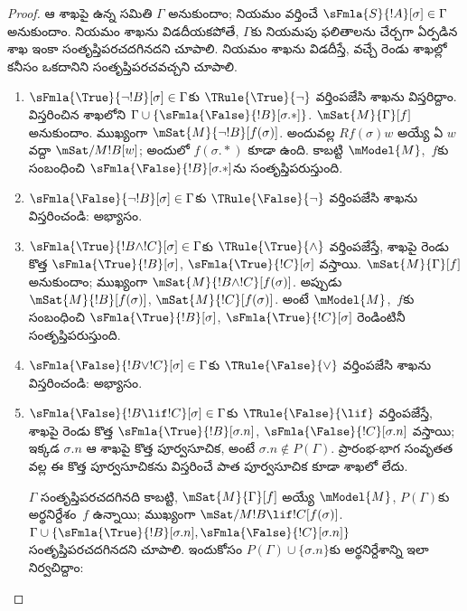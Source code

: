 \documentclass[../../../include/open-logic-section]{subfiles}
\begin{document}
\begin{proof}
ఆ శాఖపై ఉన్న  సమితి
$\Gamma$ అనుకుందాం; నియమం వర్తించే
$\sFmla{S}{!A}[\sigma] \in \Gamma$
అనుకుందాం. నియమం శాఖను
విడదీయకపోతే, $\Gamma$కు నియమపు
ఫలితాలను చేర్చగా ఏర్పడిన శాఖ
ఇంకా సంతృప్తిపరచదగినదని చూపాలి.
నియమం శాఖను విడదీస్తే, వచ్చే రెండు శాఖల్లో
కనీసం ఒకదానిని సంతృప్తిపరచవచ్చని చూపాలి.
\begin{enumerate}
\item $\sFmla{\True}{\lnot !B}[\sigma] \in \Gamma$కు
  $\TRule{\True}{\lnot}$ వర్తింపజేసి
  శాఖను విస్తరిద్దాం. విస్తరించిన
  శాఖలోని  $\Gamma \cup
  \{\sFmla{\False}{!B}[\sigma.{*}]\}$.
  $\mSat{M}{\Gamma}[f]$ అనుకుందాం.
  ముఖ్యంగా $\mSat{M}{\lnot !B}[f(\sigma)]$.
  అందువల్ల $Rf(\sigma)w$ అయ్యే ఏ $w$
  వద్దా $\mSat/{M}{!B}[w]$; అందులో
  $f(\sigma.{*})$ కూడా ఉంది.
  కాబట్టి $\mModel{M}$,~$f$కు
  సంబంధించి
  $\sFmla{\False}{!B}[\sigma.{*}]$ను
  సంతృప్తిపరుస్తుంది.
\item $\sFmla{\False}{\lnot !B}[\sigma] \in \Gamma$కు
  $\TRule{\False}{\lnot}$
  వర్తింపజేసి శాఖను విస్తరించండి:
  అభ్యాసం.
\item $\sFmla{\True}{!B \land !C}[\sigma] \in
  \Gamma$కు $\TRule{\True}{\land}$
  వర్తింపజేస్తే, శాఖపై రెండు కొత్త
  $\sFmla{\True}{!B}[\sigma]$,
  $\sFmla{\True}{!C}[\sigma]$ వస్తాయి.
  $\mSat{M}{\Gamma}[f]$ అనుకుందాం;
  ముఖ్యంగా $\mSat{M}{!B \land
    !C}[f(\sigma)]$. అప్పుడు
  $\mSat{M}{!B}[f(\sigma)]$,
  $\mSat{M}{!C}[f(\sigma)]$. అంటే
  $\mModel{M}$,~$f$కు సంబంధించి
  $\sFmla{\True}{!B}[\sigma]$,
  $\sFmla{\True}{!C}[\sigma]$
  రెండింటినీ సంతృప్తిపరుస్తుంది.
\item $\sFmla{\False}{!B \lor !C}[\sigma] \in \Gamma$కు
  $\TRule{\False}{\lor}$ వర్తింపజేసి
  శాఖను విస్తరించండి:
  అభ్యాసం.
\item $\sFmla{\False}{!B \lif !C}[\sigma] \in
  \Gamma$కు $\TRule{\False}{\lif}$
  వర్తింపజేస్తే, శాఖపై రెండు కొత్త
  $\sFmla{\True}{!B}[\sigma.n]$,
  $\sFmla{\False}{!C}[\sigma.n]$ వస్తాయి;
  ఇక్కడ $\sigma.n$ ఆ శాఖపై కొత్త
  పూర్వసూచిక, అంటే
  $\sigma.n \notin P(\Gamma)$.
  ప్రారంభ-భాగ సంవృతత వల్ల ఈ కొత్త
  పూర్వసూచికను విస్తరించే పాత పూర్వసూచిక
  కూడా శాఖలో లేదు.
  
  $\Gamma$ సంతృప్తిపరచదగినది కాబట్టి,
  $\mSat{M}{\Gamma}[f]$ అయ్యే
  $\mModel{M}$, $P(\Gamma)$కు
  అర్థనిర్దేశం~$f$ ఉన్నాయి; ముఖ్యంగా
  $\mSat/{M}{!B \lif !C}[f(\sigma)]$.
  $\Gamma \cup
  \{\sFmla{\True}{!B}[\sigma.n],
    \sFmla{\False}{!C}[\sigma.n]\}$
  సంతృప్తిపరచదగినదని చూపాలి.
  ఇందుకోసం $P(\Gamma)
  \cup \{\sigma.n\}$కు అర్థనిర్దేశాన్ని
  ఇలా నిర్వచిద్దాం:
  

\end{enumerate}
\end{proof}
\end{document}
